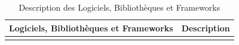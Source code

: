 \begin{longtable}[c]{
    |p{}
    |p{}|
    }
    \caption{Description des Logiciels, Bibliothèques et Frameworks}
    \label{tab:softwaredesc}                                                                                                                                                                                                                                                                                                                                                    \\
    \hline
    \textbf{Logiciels, Bibliothèques et Frameworks}                                             & \textbf{Description}                                                                                                                                                                                                                                                                                            \\
    \hline
    \endfirsthead
    \hline
    \endhead
    \hline
    \endfoot
    \hline
    \endlastfoot


\end{longtable}
